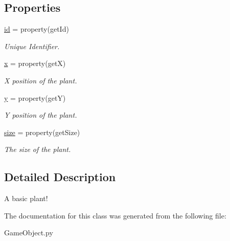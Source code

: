 \subsection*{\-Properties}
\begin{DoxyCompactItemize}
\item 
\hypertarget{classGameObject_1_1Plant_a174def084a3819ae3ce150b36e15b379}{\hyperlink{classGameObject_1_1Plant_a174def084a3819ae3ce150b36e15b379}{id} = property(get\-Id)}\label{classGameObject_1_1Plant_a174def084a3819ae3ce150b36e15b379}

\begin{DoxyCompactList}\small\item\em \-Unique \-Identifier. \end{DoxyCompactList}\item 
\hypertarget{classGameObject_1_1Plant_a5882fc37b24ecda59c907254c7d90b2b}{\hyperlink{classGameObject_1_1Plant_a5882fc37b24ecda59c907254c7d90b2b}{x} = property(get\-X)}\label{classGameObject_1_1Plant_a5882fc37b24ecda59c907254c7d90b2b}

\begin{DoxyCompactList}\small\item\em \-X position of the plant. \end{DoxyCompactList}\item 
\hypertarget{classGameObject_1_1Plant_a5f0fcb7774dea9c9d1154091513beed7}{\hyperlink{classGameObject_1_1Plant_a5f0fcb7774dea9c9d1154091513beed7}{y} = property(get\-Y)}\label{classGameObject_1_1Plant_a5f0fcb7774dea9c9d1154091513beed7}

\begin{DoxyCompactList}\small\item\em \-Y position of the plant. \end{DoxyCompactList}\item 
\hypertarget{classGameObject_1_1Plant_a4086c23b8da6cba9d06672e6a458198e}{\hyperlink{classGameObject_1_1Plant_a4086c23b8da6cba9d06672e6a458198e}{size} = property(get\-Size)}\label{classGameObject_1_1Plant_a4086c23b8da6cba9d06672e6a458198e}

\begin{DoxyCompactList}\small\item\em \-The size of the plant. \end{DoxyCompactList}\end{DoxyCompactItemize}


\subsection{\-Detailed \-Description}
\-A basic plant! 

\-The documentation for this class was generated from the following file\-:\begin{DoxyCompactItemize}
\item 
\-Game\-Object.\-py\end{DoxyCompactItemize}
